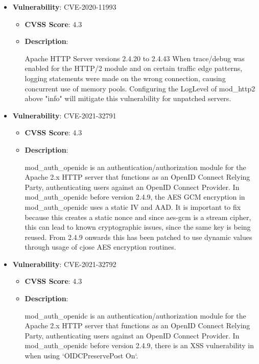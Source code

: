 \documentclass{article}
\begin{document}
\begin{itemize}
        \item \textbf{Vulnerability}: CVE-2020-11993
        \begin{itemize}
            \item \textbf{CVSS Score}:  4.3 
            \item \textbf{Description}:
            \parbox[t]{0.9\linewidth}{
                \ttfamily Apache HTTP Server versions 2.4.20 to 2.4.43 When trace/debug was enabled for the HTTP/2 module and on certain traffic edge patterns, logging statements were made on the wrong connection, causing concurrent use of memory pools. Configuring the LogLevel of mod\_http2 above "info" will mitigate this vulnerability for unpatched servers.
            }
        \end{itemize}
    
        \item \textbf{Vulnerability}: CVE-2021-32791
        \begin{itemize}
            \item \textbf{CVSS Score}:  4.3 
            \item \textbf{Description}:
            \parbox[t]{0.9\linewidth}{
                \ttfamily mod\_auth\_openidc is an authentication/authorization module for the Apache 2.x HTTP server that functions as an OpenID Connect Relying Party, authenticating users against an OpenID Connect Provider. In mod\_auth\_openidc before version 2.4.9, the AES GCM encryption in mod\_auth\_openidc uses a static IV and AAD. It is important to fix because this creates a static nonce and since aes-gcm is a stream cipher, this can lead to known cryptographic issues, since the same key is being reused. From 2.4.9 onwards this has been patched to use dynamic values through usage of cjose AES encryption routines.
            }
        \end{itemize}
    
        \item \textbf{Vulnerability}: CVE-2021-32792
        \begin{itemize}
            \item \textbf{CVSS Score}:  4.3 
            \item \textbf{Description}:
            \parbox[t]{0.9\linewidth}{
                \ttfamily mod\_auth\_openidc is an authentication/authorization module for the Apache 2.x HTTP server that functions as an OpenID Connect Relying Party, authenticating users against an OpenID Connect Provider. In mod\_auth\_openidc before version 2.4.9, there is an XSS vulnerability in when using `OIDCPreservePost On`.
            }
        \end{itemize}
    

\end{itemize}
\end{document}
